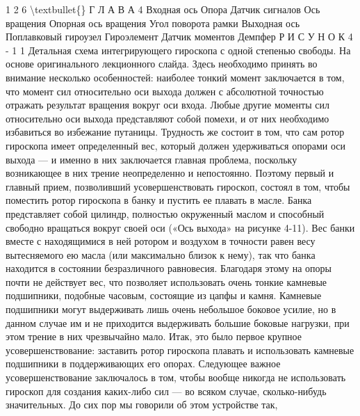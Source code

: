 \documentclass[10pt,oneside]{article}
\begin{document}
1 2 6 \textbackslash{}textbullet\{\} Г Л А В А  4 Входная ось Опора Датчик сигналов Ось вращения Опорная ось вращения Угол поворота рамки Выходная ось Поплавковый гироузел Гироэлемент Датчик моментов Демпфер Р И С У Н О К  4 - 1 1 Детальная схема интегрирующего гироскопа с одной степенью свободы. На основе оригинального лекционного слайда. Здесь необходимо принять во внимание несколько особенностей: наиболее тонкий момент заключается в том, что момент сил относительно оси выхода должен с абсолютной точностью отражать результат вращения вокруг оси входа. Любые другие моменты сил относительно оси выхода представляют собой помехи, и от них необходимо избавиться во избежание путаницы. Трудность же состоит в том, что сам ротор гироскопа имеет определенный вес, который должен удерживаться опорами оси выхода --- и именно в них заключается главная проблема, поскольку возникающее в них трение неопределенно и непостоянно. Поэтому первый и главный прием, позволивший усовершенствовать гироскоп, состоял в том, чтобы поместить ротор гироскопа в банку и пустить ее плавать в масле. Банка представляет собой цилиндр, полностью окруженный маслом и способный свободно вращаться вокруг своей оси («Ось выхода» на рисунке 4-11). Вес банки вместе с находящимися в ней ротором и воздухом в точности равен весу вытесняемого ею масла (или максимально близок к нему), так что банка находится в состоянии безразличного равновесия. Благодаря этому на опоры почти не действует вес, что позволяет использовать очень тонкие камневые подшипники, подобные часовым, состоящие из цапфы и камня. Камневые подшипники могут выдерживать лишь очень небольшое боковое усилие, но в данном случае им и не приходится выдерживать большие боковые нагрузки, при этом трение в них чрезвычайно мало. Итак, это было первое крупное усовершенствование: заставить ротор гироскопа плавать и использовать камневые подшипники в поддерживающих его опорах. Следующее важное усовершенствование заключалось в том, чтобы вообще никогда не использовать гироскоп для создания каких-либо сил --- во всяком случае, сколько-нибудь значительных. До сих пор мы говорили об этом устройстве так,\par
\end{document}
